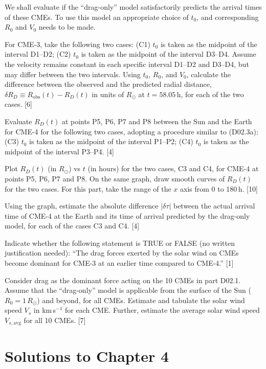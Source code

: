 \begin{description}
  We shall evaluate if the ``drag-only'' model satisfactorily predicts the
  arrival times of these CMEs. To use this model an appropriate choice of
  $t_0$, and corresponding $R_0$ and $V_0$ needs to be made.
\item[(D02.3a)] For CME-3, take the following two cases: (C1) $t_0$ is taken as
  the midpoint of the interval D1--D2; (C2) $t_0$ is taken as the midpoint of
  the interval D3--D4. Assume the velocity remains constant in each specific
  interval D1--D2 and D3--D4, but may differ between the two intervals. Using
  $t_0$, $R_0$, and $V_0$, calculate the difference between the observed and the
  predicted radial distance,
  $\delta R_D \equiv R_{\mathrm{obs}}(t) - R_D(t)$ in units of $R_\odot$ at
  $t = 58.05$\,h, for each of the two cases. \hfill[6]
\item[(D02.3b)] Evaluate $R_D(t)$ at points P5, P6, P7 and P8 between the Sun
  and the Earth for CME-4 for the following two cases, adopting a procedure
  similar to (D02.3a): (C3) $t_0$ is taken as the midpoint of the interval
  P1--P2; (C4) $t_0$ is taken as the midpoint of the interval P3--P4.
  \hfill[4]
\item[(D02.3c)] Plot $R_D(t)$ (in $R_\odot$) vs $t$ (in hours) for the two
  cases, C3 and C4, for CME-4 at points P5, P6, P7 and P8. On the same graph,
  draw smooth curves of $R_D(t)$ for the two cases. For this part, take the
  range of the $x$ axis from 0 to 180\,h. \hfill[10]
\item[(D02.3d)] Using the graph, estimate the absolute difference
  $|\delta\tau|$ between the actual arrival time of CME-4 at the Earth and its
  time of arrival predicted by the drag-only model, for each of the cases C3 and
  C4. \hfill[4]
\item[(D02.3e)] Indicate whether the following statement is TRUE or FALSE (no
  written justification needed): ``The drag forces exerted by the solar wind on
  CMEs become dominant for CME-3 at an earlier time compared to CME-4.''
  \hfill[1]
\item[(D02.4)] Consider drag as the dominant force acting on the 10 CMEs in part
  D02.1. Assume that the ``drag-only'' model is applicable from the surface of
  the Sun ($R_0 = 1\,R_\odot$) and beyond, for all CMEs. Estimate and tabulate
  the solar wind speed $V_s$ in km\,s$^{-1}$ for each CME. Further, estimate the
  average solar wind speed $V_{s,\mathrm{avg}}$ for all 10 CMEs. \hfill[7]
\end{description}

\clearpage
\section*{Solutions to Chapter 4}

